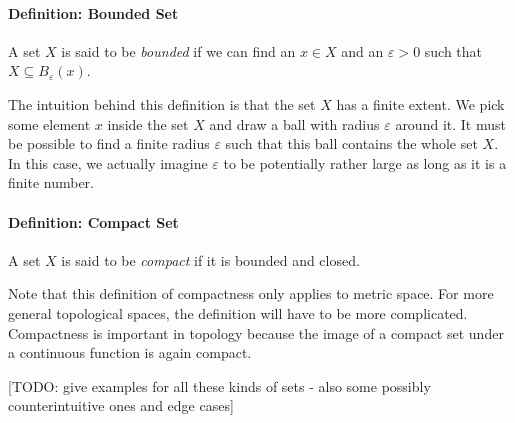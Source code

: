 


% 


\paragraph{Definition: Bounded Set} A set $X$ is said to be \emph{bounded} if we can find an $x \in X$ and an $\varepsilon > 0$ such that $X \subseteq B_\varepsilon(x)$. 

\medskip
The intuition behind this definition is that the set $X$ has a finite extent. We pick some element $x$ inside the set $X$ and draw a ball with radius $\varepsilon$ around it. It must be possible to find a finite radius $\varepsilon$ such that this ball contains the whole set $X$. In this case, we actually imagine $\varepsilon$ to be potentially rather large as long as it is a finite number.

\paragraph{Definition: Compact Set} A set $X$ is said to be \emph{compact} if it is bounded and closed.

\medskip
Note that this definition of compactness only applies to metric space. For more general topological spaces, the definition will have to be more complicated. Compactness is important in topology because the image of a compact set under a continuous function is again compact. 


[TODO: give examples for all these kinds of sets - also some possibly counterintuitive ones and edge cases]


